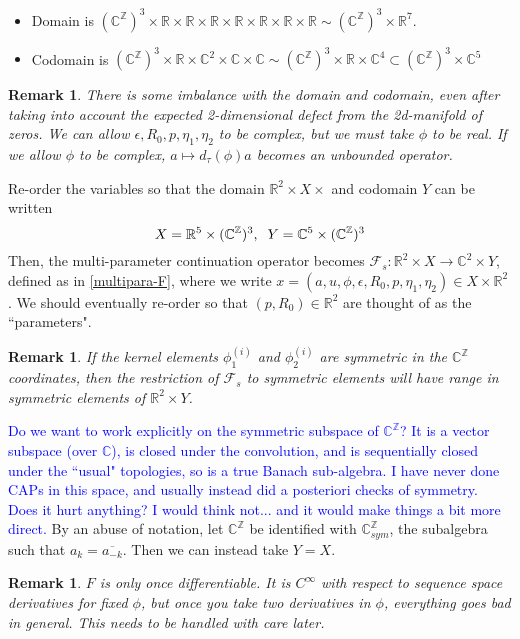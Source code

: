 \documentclass[10pt]{article}
\newcommand{\R}{\mathbb{R}}
\newcommand{\Z}{\mathbb{Z}}
\newcommand{\C}{\mathbb{C}}
\newtheorem{remark}[rem]{Remark}
\begin{document}
\begin{itemize}
\item Domain is $(\C^\Z)^3\times\R\times\R\times\R\times\R\times\R\times\R\times\R\sim (\C^\Z)^3\times\R^7$.
\item Codomain is $(\C^\Z)^3\times\R\times\C^2\times\C\times\C\sim(\C^\Z)^3\times\R\times\C^4\subset(\C^\Z)^3\times\C^5$
\end{itemize}
\begin{remark}
There is some imbalance with the domain and codomain, even after taking into account the expected 2-dimensional defect from the 2d-manifold of zeros. We can allow $\epsilon,R_0,p,\eta_1,\eta_2$ to be complex, but we \emph{must} take $\phi$ to be real. If we allow $\phi$ to be complex, $a\mapsto d_\tau(\phi)a$ becomes an unbounded operator. 
\end{remark}
Re-order the variables so that the domain $\R^2\times X\times$ and codomain $Y$ can be written $$X = \R^5\times(\C^\Z)^3,\hspace{2mm}Y=\C^5\times (\C^\Z)^3$$
Then, the multi-parameter continuation operator becomes $\mathcal{F}_s:\R^2\times X\rightarrow \C^2\times Y$, defined as in \eqref{multipara-F}, where we write $x = (a,u,\phi,\epsilon,R_0,p,\eta_1,\eta_2)\in X\times\R^2$. We should eventually re-order so that $(p,R_0)\in\R^2$ are thought of as the ``parameters".
\begin{remark}
If the kernel elements $\phi_1^{(i)}$ and $\phi_2^{(i)}$ are symmetric in the $\C^\Z$ coordinates, then the restriction of $\mathcal{F}_s$ to symmetric elements will have range in symmetric elements of $\R^2\times Y$.
\end{remark}
\textcolor{blue}{Do we want to work explicitly on the symmetric subspace of $\C^\Z$? It is a vector subspace (over $\C$), is closed under the convolution, and is sequentially closed under the ``usual" topologies, so is a true Banach sub-algebra. I have never done CAPs in this space, and usually instead did a posteriori checks of symmetry. Does it hurt anything? I would think not... and it would make things a bit more direct.} By an abuse of notation, let $\C^\Z$ be identified with $\C^\Z_{sym}$, the subalgebra such that $a_k=\overline{a_{-k}}$. Then we can instead take $Y=X$.

\begin{remark}
$F$ is only once differentiable. It is $C^\infty$ with respect to sequence space derivatives for \emph{fixed} $\phi$, but once you take two derivatives in $\phi$, everything goes bad in general. This needs to be handled with care later.
\end{remark}
\end{document}
